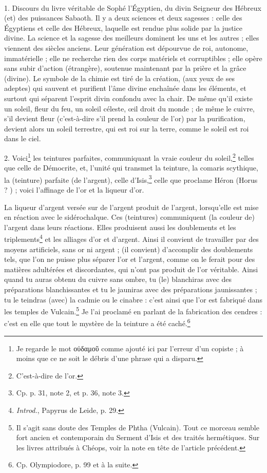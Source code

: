 \documentclass[a4paper, 11pt, oneside, polutonikogreek, french]{article}
\begin{document}
\paragraph{}
1. Discours du livre véritable de Sophé l'Égyptien, du divin Seigneur des Hébreux (et) des puissances Sabaoth. Il y a deux sciences et deux sagesses : celle des Égyptiens et celle des Hébreux, laquelle est rendue plus solide par la justice divine. La science et la sagesse des meilleurs dominent les uns et les autres ; elles viennent des siècles anciens. Leur génération est dépourvue de roi, autonome, immatérielle ; elle ne recherche rien des corps matériels et corruptibles ; elle opère sans subir d'action (étrangère), soutenue maintenant par la prière et la grâce (divine). Le symbole de la chimie est tiré de la création, (aux yeux de ses adeptes) qui sauvent et purifient l'âme divine enchaînée dans les éléments, et surtout qui séparent l'esprit divin confondu avec la chair. De même qu'il existe un soleil, fleur du feu, un soleil céleste, œil droit du monde ; de même le cuivre, s'il devient fleur (c'est-à-dire s'il prend la couleur de l'or) par la purification, devient alors un soleil terrestre, qui est roi sur la terre, comme le soleil est roi dans le ciel.

2. Voici\footnote{Je regarde le mot οὐδαμοῦ comme ajouté ici par l'erreur d'un copiste ; à moins que ce ne soit le débris d'une phrase qui a disparu.} les teintures parfaites, communiquant la vraie couleur du soleil,\footnote{C'est-à-dire de l'or.} telles que celle de Démocrite, et, l'unité qui transmet la teinture, la comaris scythique, la (teinture) parfaite (de l'argent), celle d'Isis,\footnote{Cp. p. 31, note 2, et p. 36, note 3.} celle que proclame Héron (Horus ? ) ; voici l'affinage de l'or et la liqueur d'or.

La liqueur d'argent versée sur de l'argent produit de l'argent, lorsqu'elle est mise en réaction avec le sidérochalque. Ces (teintures) communiquent (la couleur de) l'argent dans leurs réactions. Elles produisent aussi les doublements et les triplements\footnote{\emph{Introd.}, Papyrus de Leide, p. 29.} et les alliages d'or et d'argent. Ainsi il convient de travailler par des moyens artificiels, sans or ni argent ; (il convient) d'accomplir des doublements tels, que l'on ne puisse plus séparer l'or et l'argent, comme on le ferait pour des matières adultérées et discordantes, qui n'ont pas produit de l'or véritable. Ainsi quand tu auras obtenu du cuivre sans ombre, tu (le) blanchiras avec des préparations blanchissantes et tu le jauniras avec des préparations jaunissantes ; tu le teindras (avec) la cadmie ou le cinabre : c'est ainsi que l'or est fabriqué dans les temples de Vulcain.\footnote{Il s'agit sans doute des Temples de Phtha (Vulcain). Tout ce morceau semble fort ancien et contemporain du Serment d'Isis et des traités hermétiques. Sur les livres attribués à Chéops, voir la note en tête de l'article précédent.} Je l'ai proclamé en parlant de la fabrication des cendres : c'est en elle que tout le mystère de la teinture a été caché.\footnote{Cp. Olympiodore, p. 99 et à la suite.}
\end{document}
